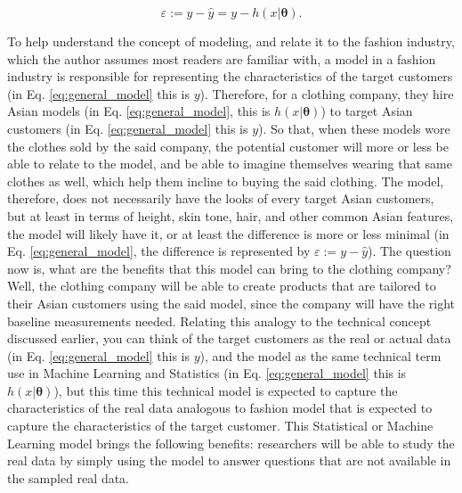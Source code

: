\begin{equation}
    \varepsilon:=y-\hat{y}=y-h(x|\boldsymbol{\theta}).
\end{equation}

To help understand the concept of modeling, and relate it to the fashion industry, which the author assumes most readers are familiar with, a model in a fashion industry is responsible for representing the characteristics of the target customers (in Eq. \ref{eq:general_model} this is $y$). Therefore, for a clothing company, they hire Asian models (in Eq. \ref{eq:general_model}, this is $h(x|\boldsymbol{\theta})$) to target Asian customers (in Eq. \ref{eq:general_model} this is $y$). So that, when these models wore the clothes sold by the said company, the potential customer will more or less be able to relate to the model, and be able to imagine themselves wearing that same clothes as well, which help them incline to buying the said clothing. The model, therefore, does not necessarily have the looks of every target Asian customers, but at least in terms of height, skin tone, hair, and other common Asian features, the model will likely have it, or at least the difference is more or less minimal (in Eq. \ref{eq:general_model}, the difference is represented by $\varepsilon:=y-\hat{y}$). The question now is, what are the benefits that this model can bring to the clothing company? Well, the clothing company will be able to create products that are tailored to their Asian customers using the said model, since the company will have the right baseline measurements needed. Relating this analogy to the technical concept discussed earlier, you can think of the target customers as the
real or actual data (in Eq. \ref{eq:general_model} this is $y$), and the model as the same technical term use in Machine Learning and Statistics (in Eq. \ref{eq:general_model} this is $h(x|\boldsymbol{\theta})$), but this time this technical model is expected to capture the characteristics of the real data analogous to fashion model that is expected to capture the characteristics of the target customer. This Statistical or Machine Learning model brings the following benefits: researchers will be able to study the real data by simply using the model to answer questions that are not available in the sampled real data.

